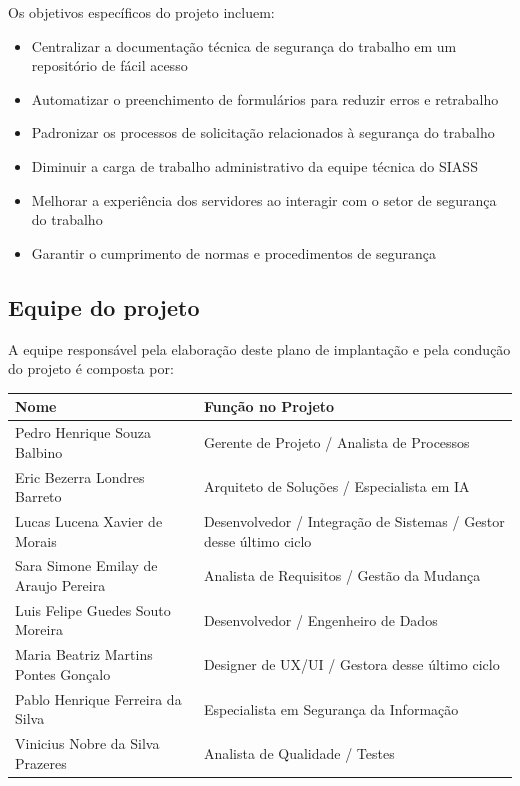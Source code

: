 \documentclass[12pt,a4paper]{article}
\begin{document}
Os objetivos específicos do projeto incluem:

\begin{itemize}
    \item Centralizar a documentação técnica de segurança do trabalho em um repositório de fácil acesso
    \item Automatizar o preenchimento de formulários para reduzir erros e retrabalho
    \item Padronizar os processos de solicitação relacionados à segurança do trabalho
    \item Diminuir a carga de trabalho administrativo da equipe técnica do SIASS
    \item Melhorar a experiência dos servidores ao interagir com o setor de segurança do trabalho
    \item Garantir o cumprimento de normas e procedimentos de segurança
\end{itemize}

\subsection{Equipe do projeto}
A equipe responsável pela elaboração deste plano de implantação e pela condução do projeto é composta por:

\begin{table}[htbp]
\centering
\begin{tabular}{|p{5cm}|p{8cm}|}
\hline
\textbf{Nome} & \textbf{Função no Projeto} \\
\hline
Pedro Henrique Souza Balbino & Gerente de Projeto / Analista de Processos \\
\hline
Eric Bezerra Londres Barreto & Arquiteto de Soluções / Especialista em IA \\
\hline
Lucas Lucena Xavier de Morais & Desenvolvedor / Integração de Sistemas / Gestor desse último ciclo \\
\hline
Sara Simone Emilay de Araujo Pereira & Analista de Requisitos / Gestão da Mudança \\
\hline
Luis Felipe Guedes Souto Moreira & Desenvolvedor / Engenheiro de Dados \\
\hline
Maria Beatriz Martins Pontes Gonçalo & Designer de UX/UI / Gestora desse último ciclo \\
\hline
Pablo Henrique Ferreira da Silva & Especialista em Segurança da Informação \\
\hline
Vinicius Nobre da Silva Prazeres & Analista de Qualidade / Testes \\
\hline
\end{tabular}
\end{table}
\end{document}
